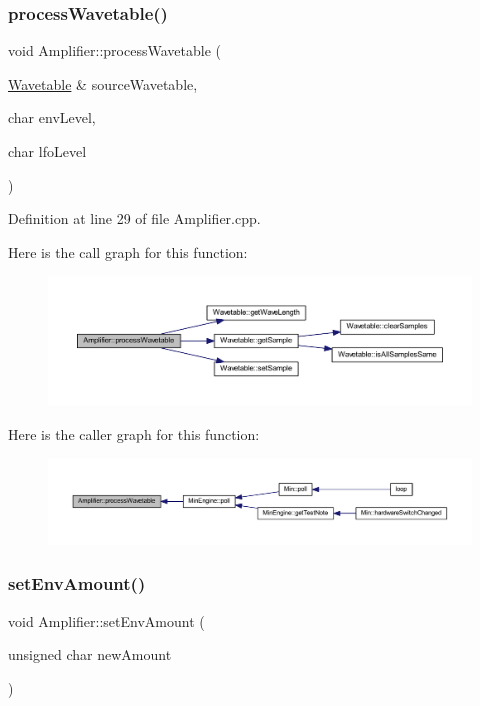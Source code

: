 \subsubsection{\texorpdfstring{process\+Wavetable()}{processWavetable()}}
{\footnotesize\ttfamily void Amplifier\+::process\+Wavetable (\begin{DoxyParamCaption}\item[{\hyperlink{class_wavetable}{Wavetable} \&}]{source\+Wavetable,  }\item[{char}]{env\+Level,  }\item[{char}]{lfo\+Level }\end{DoxyParamCaption})}



Definition at line 29 of file Amplifier.\+cpp.

Here is the call graph for this function\+:
\nopagebreak
\begin{figure}[H]
\begin{center}
\leavevmode
\includegraphics[width=350pt]{de/d01/class_amplifier_a3f1ec0c50fdb0adb71e2f7576e38170a_cgraph}
\end{center}
\end{figure}
Here is the caller graph for this function\+:
\nopagebreak
\begin{figure}[H]
\begin{center}
\leavevmode
\includegraphics[width=350pt]{de/d01/class_amplifier_a3f1ec0c50fdb0adb71e2f7576e38170a_icgraph}
\end{center}
\end{figure}
\mbox{\label{class_amplifier_a1106605e158c9855d4e303e6972baf9f}} 
\subsubsection{\texorpdfstring{set\+Env\+Amount()}{setEnvAmount()}}
{\footnotesize\ttfamily void Amplifier\+::set\+Env\+Amount (\begin{DoxyParamCaption}\item[{unsigned char}]{new\+Amount }\end{DoxyParamCaption})\hspace{0.3cm}{\ttfamily [inline]}}



